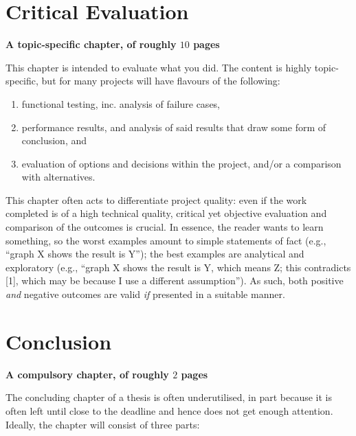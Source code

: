 \documentclass[ %
                    author={Sam Phippen},
                supervisor={Dr. Rafal Bogacz},
                     title={Real time voice activity detectors in noisy personal computing environments},
                  subtitle={},
                    degree={MEng},
                      year={2012} ]{thesis}
\begin{document}
\chapter{Critical Evaluation}
\label{chap:evaluation}

{\bf A topic-specific chapter, of roughly $10$ pages} 
\vspace{1cm} 

\noindent
This chapter is intended to evaluate what you did.  The content is highly 
topic-specific, but for many projects will have flavours of the following:

\begin{enumerate}
\item functional testing, inc. analysis of failure cases,
\item performance results, and analysis of said results that draw some 
      form of conclusion,
      and
\item evaluation of options and decisions within the project, and/or a
      comparison with alternatives.
\end{enumerate}

\noindent
This chapter often acts to differentiate project quality: even if the work
completed is of a high technical quality, critical yet objective evaluation 
and comparison of the outcomes is crucial.  In essence, the reader wants to
learn something, so the worst examples amount to simple statements of fact 
(e.g., ``graph X shows the result is Y''); the best examples are analytical 
and exploratory (e.g., ``graph X shows the result is Y, which means Z; this 
contradicts [1], which may be because I use a different assumption'').  As 
such, both positive {\em and} negative outcomes are valid {\em if} presented 
in a suitable manner.


\chapter{Conclusion}
\label{chap:conclusion}

{\bf A compulsory chapter, of roughly $2$ pages} 
\vspace{1cm} 

\noindent
The concluding chapter of a thesis is often underutilised, in part because
it is often left until close to the deadline and hence does not get enough 
attention.  Ideally, the chapter will consist of three parts:
\end{document}
